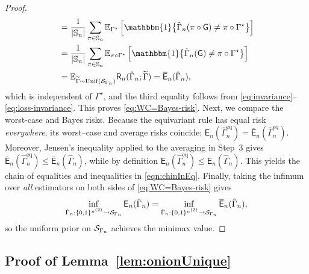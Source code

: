 \documentclass[12pt]{article}
\newcommand{\Ind}{\mathbbm{1}}
\newcommand{\E}{\mathbb{E}}
\newcommand{\calS}{{\cal S}}
\newcommand{\pp}[1]{\left[#1\right]}
\newcommand{\s}[1]{\mathsf{#1}}
\begin{document}
\begin{proof}
\begin{align}
&=\frac1{|\mathbb{S}_n|}
   \sum_{\pi\in \mathbb{S}_n}
   \E_{\Gamma^\star}
      \pp{\Ind \bigl\{\hat{\Gamma}_n(\pi  \circ \s G)
                      \neq\pi  \circ \Gamma^\star\bigr\}}\\
&=
   \frac1{|\mathbb{S}_n|}
   \sum_{\pi\in \mathbb{S}_n}
   \E_{\pi \circ\Gamma^\star}
      \pp{\Ind \bigl\{\hat{\Gamma}_n(\s G)
                      \neq\pi  \circ \Gamma^\star\bigr\}}\\
&=\E_{\widetilde{\Gamma}\sim\mathrm{Unif}(\calS_{\Gamma_n})}
      \s{R}_n(\hat{\Gamma}_n;\widetilde{\Gamma})
   =\overline{\s E}_n(\hat{\Gamma}_n),
\end{align}
which is independent of $\Gamma^\star$, and the third equality follows from \eqref{eq:invariance}--\eqref{eq:loss-invariance}. This proves \eqref{eq:WC=Bayes-risk}. Next, we compare the worst-case and Bayes risks. Because the equivariant rule has equal risk \emph{everywhere}, its worst–case and average risks coincide:
$\s E_n(\hat{\Gamma}_n^{\mathrm{eq}})  =\overline{\s E}_n(\hat{\Gamma}_n^{\mathrm{eq}})$. Moreover, Jensen's inequality applied to the averaging in Step~3 gives $\overline{\s E}_n(\hat{\Gamma}_n^{\mathrm{eq}})\leq\overline{\s E}_n(\hat{\Gamma}_n)$, while by definition $\s E_n(\hat{\Gamma}_n^{\mathrm{eq}})  \leq\s E_n(\hat{\Gamma}_n)$. This yields the chain of equalities and inequalities in \eqref{eqn:chinInEq}. Finally, taking the infimum over \emph{all} estimators on both sides of
\eqref{eq:WC=Bayes-risk} gives
\begin{align}
\inf_{\hat{\Gamma}_n:\{0,1\}^{n^{(2)}} \to \calS_{\Gamma_n}}\s E_n(\hat{\Gamma}_n)
  =\inf_{\hat{\Gamma}_n:\{0,1\}^{n^{(2)}} \to \calS_{\Gamma_n}}\overline{\s E}_n(\hat{\Gamma}_n),
\end{align}
so the uniform prior on $\calS_{\Gamma_n}$ achieves the minimax value.
\end{proof}

\subsection{Proof of Lemma~\ref{lem:onionUnique}}\label{app:onionUn}
\end{document}
